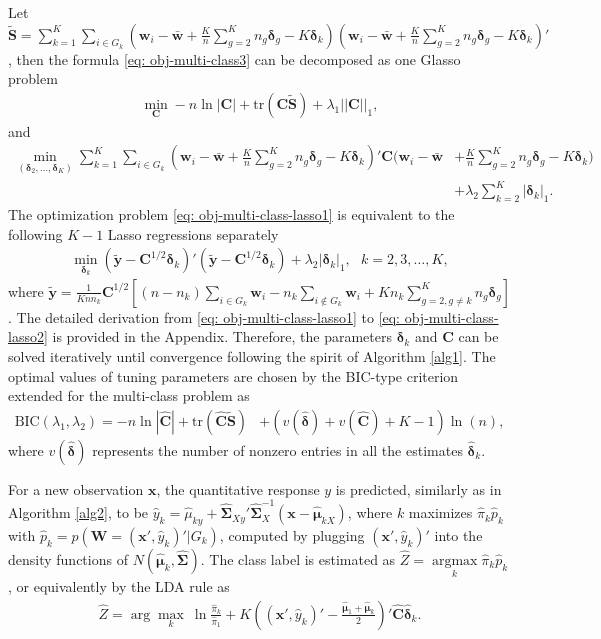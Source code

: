 \documentclass[12pt]{article}
\newcommand{\tr}{\mbox{tr}}
\begin{document}
Let $\tilde{\bm S} = \sum_{k=1}^{K} \sum_{i\in G_k} (\bm w_i - \bar{\bm w} + \frac{K}{n} \sum_{g=2}^{K} n_g \bm \delta_g - K \bm \delta_k)(\bm w_i - \bar{\bm w} + \frac{K}{n} \sum_{g=2}^{K} n_g \bm \delta_g - K \bm \delta_k)'$, then the formula \eqref{eq: obj-multi-class3} can be decomposed as one Glasso problem
\begin{align*}
\min_{\bm C} -n \ln|\bm C| + \tr(\bm C \tilde{\bm S}) + \lambda_1||\bm C||_1,
\end{align*}
and
\begin{align}\label{eq: obj-multi-class-lasso1}
\min_{(\bm \delta_2, \ldots, \bm \delta_K)} \sum_{k=1}^{K} \sum_{i\in G_k} (\bm w_i - \bar{\bm w} + \frac{K}{n} \sum_{g=2}^{K} n_g \bm \delta_g - K \bm \delta_k)' \bm C (\bm w_i - \bar{\bm w} &+ \frac{K}{n} \sum_{g=2}^{K} n_g \bm \delta_g
- K \bm \delta_k) \nonumber \\
&+ \lambda_2  \sum_{k=2}^{K} | \bm \delta_k |_1.
\end{align}
The optimization problem \eqref{eq: obj-multi-class-lasso1} is equivalent to the following $K - 1$ Lasso regressions separately
\begin{align}\label{eq: obj-multi-class-lasso2}
\min_{\bm \delta_k} (\tilde{\bm y} - \bm C^{1/2} \bm \delta_k)'(\tilde{\bm y} - \bm C^{1/2} \bm \delta_k) + \lambda_2 |\bm \delta_k|_1, ~~~ k = 2, 3, \ldots, K,
\end{align}
where $\tilde{\bm y}= \frac{1}{K n n_k} \bm C^{1/2} \left[(n - n_k) \sum\limits_{i \in G_k}\bm w_i - n_k \sum\limits_{i \notin G_k}\bm w_i + K n_k \sum\limits_{g = 2, g \neq k}^K n_g \bm \delta_g \right]$.
The detailed derivation from \eqref{eq: obj-multi-class-lasso1} to \eqref{eq: obj-multi-class-lasso2} is provided in the Appendix.
Therefore, the parameters $\bm \delta_k$ and $\bm C$ can be solved iteratively until convergence following the spirit of Algorithm \ref{alg1}.
The optimal values of tuning parameters are chosen by the BIC-type criterion extended for the multi-class problem as
\begin{align*}
\mbox{BIC}(\lambda_1,\lambda_2)=-n\ln|\hat{\bm C}| + \tr(\hat{\bm C}\tilde{\bm S})& + (v(\hat{\bm \delta}) + v(\hat{\bm C}) + K - 1) \ln(n),
\end{align*}
where $v(\hat{\bm \delta})$ represents the number of nonzero entries in all the estimates $\hat{\bm \delta}_k$.

For a new observation $\bm x$, the quantitative response $y$ is predicted, similarly as in Algorithm \ref{alg2}, to be $\hat{y}_k = \hat{\mu}_{ky} + \hat{\bm \Sigma}_{Xy}' \hat{\bm \Sigma}_{X}^{-1} (\bm x - \hat{\bm \mu}_{kX})$, where $k$ maximizes $\hat{\pi}_k \hat{p}_k$ with $\hat{p}_k=p(\bm W = (\bm x', \hat{y}_k)' | G_k )$, computed by plugging $(\bm x', \hat{y}_k)'$ into the density functions of $N(\hat{\bm \mu}_k, \hat{\bm \Sigma})$.
The class label is estimated
as $\hat{Z} = \mathop{\arg \max}\limits_{k} \hat{\pi}_k \hat{p}_k$, or equivalently by the LDA rule as
\begin{align*}
\hat{Z} = \arg\max_{k} ~ \ln \frac{\hat{\pi}_k}{\hat{\pi}_1} + K ((\bm x', \hat{y}_k)' - \frac{\hat{\bm \mu}_1 + \hat{\bm \mu}_k}{2})' \hat{\bm C} \hat{\bm \delta}_k.
\end{align*}
\end{document}

